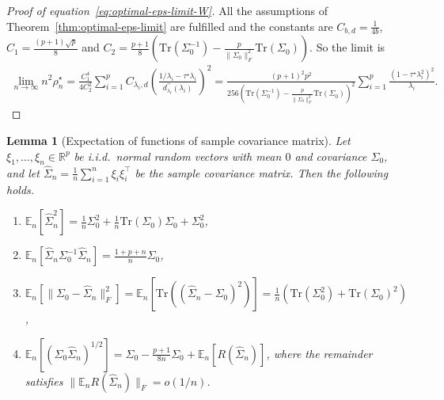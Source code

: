 \documentclass[11pt]{article}
\def\R{\mathbb{R}}
\newtheorem{lemma}{Lemma}
\newcommand{\opt}{^\star}
\def\transpose{\top}
\def\R{\mathbb{R}}
\def\E {\mathbb{E}}
\def\tr{\mathrm{Tr}}
\newcommand{\wh}{\widehat}
\begin{document}
\begin{proof}[Proof of equation~\eqref{eq:optimal-eps-limit-W}]
    All the assumptions of Theorem~\ref{thm:optimal-eps-limit} are fulfilled and the constants are $C_{b,d}=\frac{1}{4b}$, $C_1=\frac{(p+1)\sqrt{p}}{8}$ and $C_2=\frac{p+1}{8}\left(\tr(\Sigma_0^{-1}) - \frac{p}{\|\Sigma_0\|_F^2}\tr(\Sigma_0)\right)$. So the limit is 
    \begin{align*}
        \lim_{n\to\infty} n^2  \rho_n\opt = \frac{C_1^4}{4C_2^2} \sum_{i=1}^p C_{\lambda_i, d} \left(\frac{1/\lambda_i-\tau\opt \lambda_i}{d_{\lambda_i}^{\prime\prime}(\lambda_i)} \right)^2 = \frac{(p+1)^2p^2}{256\left(\tr(\Sigma_0^{-1}) - \frac{p}{\|\Sigma_0\|_F^2}\tr(\Sigma_0)\right)^2}\sum_{i=1}^p \frac{(1-\tau\opt \lambda_i^2)^2}{\lambda_i}.
    \end{align*}
\end{proof}
\begin{lemma}[Expectation of functions of sample covariance matrix]\label{lemma:Wishart-matrix} Let $\xi_1, \ldots ,\xi_n\in\R^p$ be i.i.d.~normal random vectors with mean $0$ and covariance $\Sigma_0$, and let $\wh\Sigma_n = \frac{1}{n}\sum_{i=1}^n \xi_i\xi_i^\transpose$ be the sample covariance matrix. Then the following holds.
\begin{enumerate}[label = (\roman*)]
        \item $\E_n [\wh \Sigma_n^2]=\frac{1}{n}\Sigma_0^2+\frac{1}{n}\tr(\Sigma_0)\Sigma_0+\Sigma_0^2$,
        \item $\E_n [\wh \Sigma_n \Sigma_0^{-1} \wh \Sigma_n]=\frac{1+p+n}{n}\Sigma_0$,
        \item $\E_n [\|\Sigma_0-\wh\Sigma_n\|_F^2]=\E_n \left[\tr\left((\wh\Sigma_n-\Sigma_0)^2\right)\right] = \frac{1}{n}(\tr(\Sigma_0^2)+\tr(\Sigma_0)^2)$,
        \item $\E_n [(\Sigma_0\wh \Sigma_n)^{1/2}]=\Sigma_0 - \frac{p+1}{8n}\Sigma_0 + \E_n [R(\wh\Sigma_n)]$, where the remainder satisfies $\|\E_n  R(\wh\Sigma_n)\|_F=o(1/n)$.
    \end{enumerate}
\end{lemma}
\end{document}
